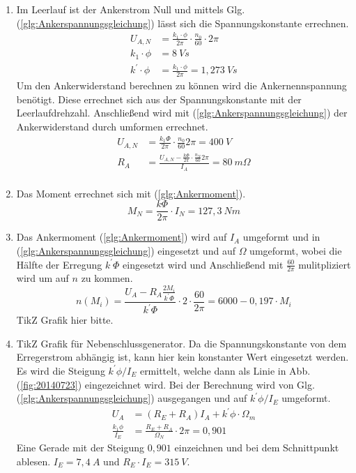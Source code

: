 \begin{solution}
\begin{enumerate}
\item Im Leerlauf ist der Ankerstrom Null und mittels Glg.(\ref{glg:Ankerspannungsgleichung}) lässt sich die Spannungskonstante errechnen.
\begin{align}
U_{A,N} &= \frac{k_1 \cdot \phi}{2 \pi} \cdot \frac{n_0}{60} \cdot 2 \pi\\
k_1 \cdot \phi &= 8~Vs\\
k^{'} \cdot \phi &= \frac{k_1 \cdot \phi}{2 \pi} = 1,273~Vs
\end{align}
Um den Ankerwiderstand berechnen zu können wird die Ankernennspannung benötigt. Diese errechnet sich aus der Spannungskonstante mit der Leerlaufdrehzahl. Anschließend wird mit (\ref{glg:Ankerspannungsgleichung}) der Ankerwiderstand durch umformen errechnet.\\
\begin{align}
U_{A,N} &= \frac{k_1 \Phi}{2 \pi} \cdot \frac{n_0}{60} 2 \pi = 400~V\\
R_A &= \frac{U_{A,N} - \frac{k \Phi}{2 \pi} \cdot \frac{n_N}{60} 2 \pi}{I_A}=80~m \Omega\\
\end{align}
\item Das Moment errechnet sich mit (\ref{glg:Ankermoment}).\\
\begin{equation}
M_N=\frac{k \Phi}{2 \pi} \cdot I_N =127,3~Nm
\end{equation}
\item Das Ankermoment (\ref{glg:Ankermoment}) wird auf $I_A$ umgeformt und in (\ref{glg:Ankerspannungsgleichung}) eingesetzt und auf $\Omega$ umgeformt, wobei die Hälfte der Erregung $k^{'} \Phi$ eingesetzt wird und Anschließend mit $\frac{60}{2 \pi}$ mulitpliziert wird um auf $n$ zu kommen.
\begin{equation}
n(M_i) = \frac{U_A - R_A \frac{2 M_i}{k^{'} \Phi}}{k^{'}\Phi} \cdot 2 \cdot \frac{60}{2 \pi} =6000-0,197 \cdot M_i
\end{equation}
TikZ Grafik hier bitte.
\item TikZ Grafik für Nebenschlussgenerator. Da die Spannungskonstante von dem Erregerstrom abhängig ist, kann hier kein konstanter Wert eingesetzt werden. Es wird die Steigung $k^{'} \phi/I_E$ ermittelt, welche dann als Linie in Abb.(\ref{fig:20140723}) eingezeichnet wird. Bei der Berechnung wird von Glg.(\ref{glg:Ankerspannungsgleichung}) ausgegangen und auf $k^{'} \phi/I_E$ umgeformt.
\begin{align}
U_A &= (R_E +R_A)  I_A  + k^{'} \phi \cdot \Omega_m\\
\frac{k_1 \phi}{I_E} &= \frac{R_E +R_A}{\Omega_N}\cdot 2 \pi = 0,901
\end{align}
Eine Gerade mit der Steigung $0,901$ einzeichnen und bei dem Schnittpunkt ablesen. $I_E= 7,4~A$ und $R_E \cdot I_E = 315~V$.
\end{enumerate}
\end{solution}